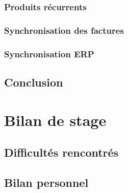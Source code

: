 \documentclass{Article}
\begin{document}
		\subsubsection{Produits récurrents}
		\subsubsection{Synchronisation des factures}
		\subsubsection{Synchronisation ERP}
	\subsection{Conclusion}	
\section{Bilan de stage}
	\subsection{Difficultés rencontrés}
	\subsection{Bilan personnel}
\end{document}
